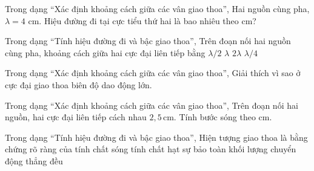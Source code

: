 \begin{ex}
Trong dạng “Xác định khoảng cách giữa các vân giao thoa”, Hai nguồn cùng pha, $\lambda=4$ cm. Hiệu đường đi tại cực tiểu thứ hai là bao nhiêu theo cm?
\end{ex}

\begin{ex}
Trong dạng “Tính hiệu đường đi và bậc giao thoa”, Trên đoạn nối hai nguồn cùng pha, khoảng cách giữa hai cực đại liên tiếp bằng
\choice
{\True $\lambda/2$}
{$\lambda$}
{$2\lambda$}
{$\lambda/4$}
\end{ex}

\begin{ex}
Trong dạng “Xác định khoảng cách giữa các vân giao thoa”, Giải thích vì sao ở cực đại giao thoa biên độ dao động lớn.
\choiceTF

\end{ex}

\begin{ex}
Trong dạng “Xác định khoảng cách giữa các vân giao thoa”, Trên đoạn nối hai nguồn, hai cực đại liên tiếp cách nhau $2,5\,\text{cm}$. Tính bước sóng theo cm.
\end{ex}

\begin{ex}
Trong dạng “Tính hiệu đường đi và bậc giao thoa”, Hiện tượng giao thoa là bằng chứng rõ ràng của
\choice
{\True tính chất sóng}
{tính chất hạt}
{sự bảo toàn khối lượng}
{chuyển động thẳng đều}
\end{ex}

